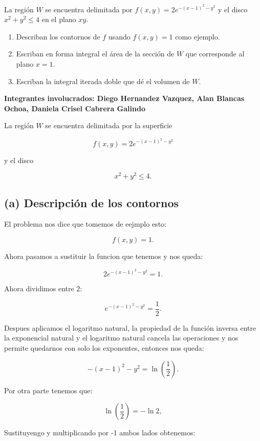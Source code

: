 \begin{ejercicio}
    La región $W$ se encuentra delimitada por $f(x, y) = 2e^{-(x-1)^2 - y^2}$ y el disco $x^2 + y^2 \leq 4$ en el plano $xy$.

\begin{enumerate}
    \item[(a)] Describan los contornos de $f$ usando $f(x, y) = 1$ como ejemplo.
    \item[(b)] Escriban en forma integral el área de la sección de $W$ que corresponde al plano $x = 1$.
    \item[(c)] Escriban la integral iterada doble que dé el volumen de $W$.
\end{enumerate}
\end{ejercicio}

\begin{respuesta}
        \textbf{Integrantes involucrados: Diego Hernandez Vazquez, Alan Blancas Ochoa, Daniela Crisel Cabrera Galindo}

La región \(W\) se encuentra delimitada por la superficie

\[
f(x,y)=2e^{-(x-1)^2-y^2}
\]

y el disco

\[
x^2+y^2\leq 4.
\]

\subsection*{(a) Descripción de los contornos}

El problema nos dice que tomemos de eejmplo esto:

\[
f(x,y)=1.
\]

Ahora pasamos a sustituir la funcion que tenemos y nos queda:

\[
2e^{-(x-1)^2-y^2}=1.
\]

Ahora dividimos entre \(2\):

\[
e^{-(x-1)^2-y^2}=\frac{1}{2}.
\]

Despues aplicamos el logaritmo natural, la propiedad de la función inversa entre la exponencial natural y el logaritmo natural cancela las operaciones y nos permite quedarnos con solo los exponentes, entonces nos queda: 

\[
-(x-1)^2-y^2=\ln\left(\frac{1}{2}\right).
\]

Por otra parte tenemos que: 

\[
\ln\left(\frac{1}{2}\right)=-\ln 2,
\]

Sustituyengo y multiplicando por -1 ambos lados obtenemos: 


\end{respuesta}
